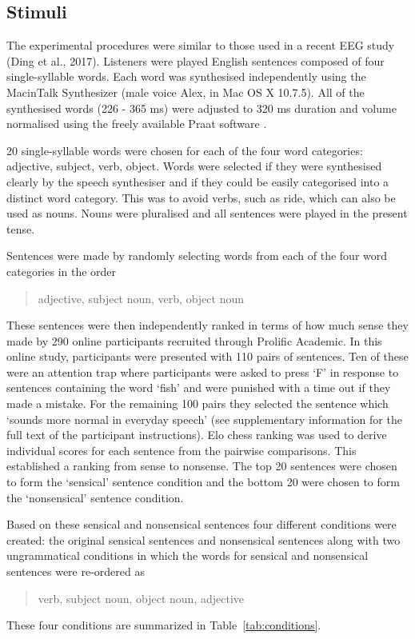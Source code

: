 \documentclass[a4paper,10pt,twoside]{article}
\begin{document}
\subsection*{Stimuli}

The experimental procedures were similar to those used in a recent EEG
study (Ding et al., 2017). Listeners were played English sentences
composed of four single-syllable words. Each word was synthesised
independently using the MacinTalk Synthesizer (male voice Alex, in Mac
OS X 10.7.5). All of the synthesised words (226 - 365 ms) were
adjusted to 320 ms duration and volume normalised using the freely
available Praat software \cite{BoersmaWeenink2018}.

20 single-syllable words were chosen for each of the four word
categories: adjective, subject, verb, object. Words were selected if
they were synthesised clearly by the speech synthesiser and if they
could be easily categorised into a distinct word category. This was
to avoid verbs, such as ride, which can
also be used as nouns. Nouns were pluralised and all sentences were
played in the present tense.

Sentences were made by randomly selecting words from each of the four
word categories in the order 
\begin{quote}
adjective, subject noun, verb, object noun
\end{quote}
These sentences were then independently ranked in terms of how
much sense they made by 290 online participants recruited through
Prolific Academic. In this online study, participants were presented with 110 pairs of
sentences. Ten of these were an attention trap where participants were asked
to press \lq{F}\rq{} in response to sentences containing the word
\lq{}fish\rq{} and were punished with a time out if they made a
mistake. For the remaining 100 pairs they selected the sentence which
\lq{}sounds more normal in everyday speech\rq{} (see supplementary
information for the full text of the participant instructions). Elo
chess ranking \cite{Elo1978} was used to derive individual scores for
each sentence from the pairwise comparisons. This established a
ranking from sense to nonsense. The top 20 sentences were chosen to form the
\lq{}sensical\rq{} sentence condition and the bottom 20 were chosen to form the \lq{}nonsensical\rq{}
sentence condition. 

Based on these sensical and nonsensical sentences four different conditions were created: the
original sensical sentences and nonsensical sentences along with two ungrammatical conditions in which the words for sensical and nonsensical sentences were re-ordered as
\begin{quote}
     verb, subject noun, object noun, adjective
\end{quote}
These four conditions are summarized in Table~\ref{tab:conditions}.
\end{document}
